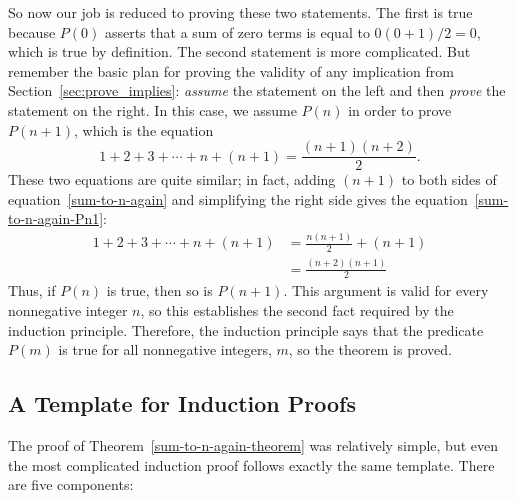 So now our job is reduced to proving these two statements.  The first
is true because $P(0)$ asserts that a sum of zero terms is equal to
$0(0+1)/2 = 0$, which is true by definition.
%
The second statement is more complicated.  But remember the basic plan for
proving the validity of any implication from
Section~\ref{sec:prove_implies}: \emph{assume} the statement on 
the left and then \emph{prove} the statement on the right.  In this
case, we assume $P(n)$ in order to prove $P(n+1)$, which is the equation
\begin{equation}\label{sum-to-n-again-Pn1}
1 + 2 + 3 + \cdots + n + (n+1) = \frac{(n+1)(n+2)}{2}.
\end{equation}
These two equations are quite similar; in fact, adding $(n+1)$ to both
sides of equation~\eqref{sum-to-n-again} and simplifying the right side 
gives the equation~\eqref{sum-to-n-again-Pn1}:
\begin{align*}
1 + 2 + 3 + \cdots + n + (n+1)
    & = \frac{n(n+1)}{2} + (n+1) \\
    & = \frac{(n+2)(n+1)}{2}
\end{align*}
Thus, if $P(n)$ is true, then so is $P(n+1)$.  This argument is valid for
every nonnegative integer $n$, so this establishes the second fact
required by the induction principle.  Therefore, the induction principle
says that the predicate $P(m)$ is true for all nonnegative integers, $m$,
so the theorem is proved.

\subsection{A Template for Induction Proofs}
\label{templ-induct-proofs}

The proof of Theorem~\ref{sum-to-n-again-theorem} was relatively simple,
but even the most complicated induction proof follows exactly the same
template.  There are five components:

